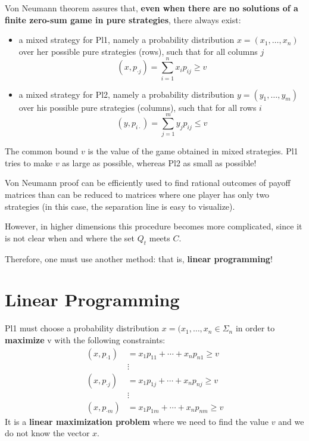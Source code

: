 \documentclass[../main.tex]{subfiles}
\begin{document}
Von Neumann theorem assures that, \textbf{even when there are no solutions of a finite zero-sum game in pure strategies}, there always exist:
\begin{itemize}
    \item a mixed strategy for Pl1, namely a probability distribution $x = (x_1,\ldots,x_n)$ over her possible pure strategies (rows), such that for all columns $j$
          \[
              (x, p_{\cdot j}) = \sum_{i=1}^n x_i p_{ij} \geq v
          \]
    \item a mixed strategy for Pl2, namely a probability distribution $y = (y_1,\ldots,y_m)$ over his possible pure strategies (columns), such that for all rows $i$
          \[
              (y, p_{i \cdot}) = \sum_{j=1}^m y_j p_{ij} \leq v
          \]
\end{itemize}
The common bound $v$ is the value of the game obtained in mixed strategies. Pl1 tries to make $v$ as large as possible, whereas Pl2 as small as possible!

Von Neumann proof can be efficiently used to find rational outcomes of payoff matrices than can be reduced to matrices where one player has only two strategies (in this case, the separation line is easy to visualize).

However, in higher dimensions this procedure becomes more complicated, since it is not clear when and where the set $Q_t$ meets $C$.

Therefore, one must use another method: that is, \textbf{linear programming}!

\newpage

\section{Linear Programming}
Pl1 must choose a probability distribution $x = (x_1, \ldots, x_n \in \Sigma_n$ in order to \textbf{maximize} v with the following constraints:
\begin{align*}
    (x, p_{\cdot 1}) & = x_1 p_{11} + \cdots + x_n p_{n1} \geq v \\
                     & \vdots                                    \\
    (x, p_{\cdot j}) & = x_1 p_{1j} + \cdots + x_n p_{nj} \geq v \\
                     & \vdots                                    \\
    (x, p_{\cdot m}) & = x_1 p_{1m} + \cdots + x_n p_{nm} \geq v
\end{align*}
It is a \textbf{linear maximization problem} where we need to find the value $v$ and we do
not know the vector $x$.
\end{document}
